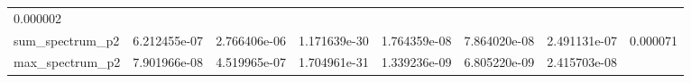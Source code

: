 \documentclass[11pt]{article}
\begin{document}
\begin{longtable}[]{@{}llllllll@{}}
\begin{minipage}[t]{0.08\columnwidth}
0.000002\strut
\end{minipage}\tabularnewline
\begin{minipage}[t]{0.16\columnwidth}\raggedright
sum\_spectrum\_p2\strut
\end{minipage} & \begin{minipage}[t]{0.09\columnwidth}\raggedright
6.212455e-07\strut
\end{minipage} & \begin{minipage}[t]{0.09\columnwidth}\raggedright
2.766406e-06\strut
\end{minipage} & \begin{minipage}[t]{0.09\columnwidth}\raggedright
1.171639e-30\strut
\end{minipage} & \begin{minipage}[t]{0.09\columnwidth}\raggedright
1.764359e-08\strut
\end{minipage} & \begin{minipage}[t]{0.09\columnwidth}\raggedright
7.864020e-08\strut
\end{minipage} & \begin{minipage}[t]{0.09\columnwidth}\raggedright
2.491131e-07\strut
\end{minipage} & \begin{minipage}[t]{0.08\columnwidth}\raggedright
0.000071\strut
\end{minipage}\tabularnewline
\begin{minipage}[t]{0.16\columnwidth}\raggedright
max\_spectrum\_p2\strut
\end{minipage} & \begin{minipage}[t]{0.09\columnwidth}\raggedright
7.901966e-08\strut
\end{minipage} & \begin{minipage}[t]{0.09\columnwidth}\raggedright
4.519965e-07\strut
\end{minipage} & \begin{minipage}[t]{0.09\columnwidth}\raggedright
1.704961e-31\strut
\end{minipage} & \begin{minipage}[t]{0.09\columnwidth}\raggedright
1.339236e-09\strut
\end{minipage} & \begin{minipage}[t]{0.09\columnwidth}\raggedright
6.805220e-09\strut
\end{minipage} & \begin{minipage}[t]{0.09\columnwidth}\raggedright
2.415703e-08\strut
\end{minipage} & \begin{minipage}[t]{0.08\columnwidth}\raggedright

\end{minipage}
\end{longtable}
\end{document}
